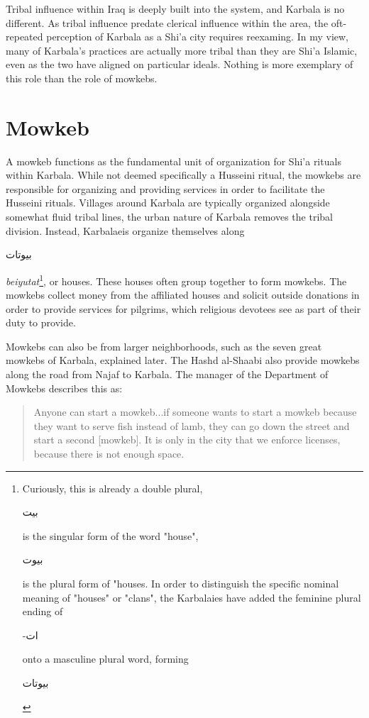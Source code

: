 Tribal influence within Iraq is deeply built into the system, and Karbala is no different. As tribal influence predate clerical influence within the area, the oft-repeated perception of Karbala as a Shi'a city requires reexaming. In my view, many of Karbala's practices are actually more tribal than they are Shi'a Islamic, even as the two have aligned on particular ideals. Nothing is more exemplary of this role than the role of mowkebs. 

\section{Mowkeb}
A mowkeb functions as the fundamental unit of organization for Shi’a rituals within Karbala. While not deemed specifically a Husseini ritual, the mowkebs are responsible for organizing and providing services in order to facilitate the Husseini rituals. Villages around Karbala are typically organized alongside somewhat fluid tribal lines, the urban nature of Karbala removes the tribal division. Instead, Karbalaeis organize themselves along \begin{Arabic}بيوتات\end{Arabic}\emph{beiyutat}\footnote{Curiously, this is already a double plural, \begin{Arabic}بيت\end{Arabic} is the singular form of the word "house", \begin{Arabic}
    بيوت
\end{Arabic} is the plural form of "houses. In order to distinguish the specific nominal meaning of "houses" or "clans", the Karbalaies have added the feminine plural ending of \begin{Arabic}
    -ات
\end{Arabic} onto a masculine plural word, forming \begin{Arabic}
    بيوتات
\end{Arabic}}, or houses. These houses often group together to form mowkebs. The mowkebs collect money from the affiliated houses and solicit outside donations in order to provide services for pilgrims, which religious devotees see as part of their duty to provide. 

Mowkebs can also be from larger neighborhoods, such as the seven great mowkebs of Karbala, explained later. The Hashd al-Shaabi also provide mowkebs along the road from Najaf to Karbala. The manager of the Department of Mowkebs describes this as:

\begin{quote}
    Anyone can start a mowkeb...if someone wants to start a mowkeb because they want to serve fish instead of lamb, they can go down the street and start a second [mowkeb]. It is only in the city that we enforce licenses, because there is not enough space.
\end{quote}

